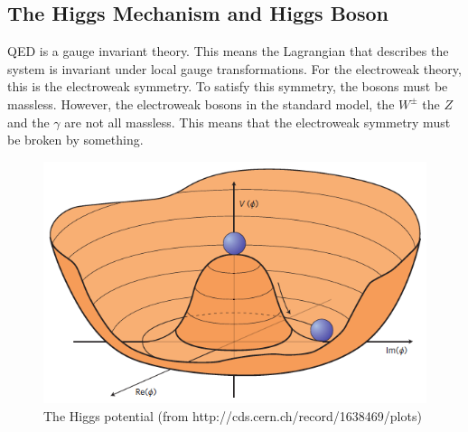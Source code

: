 


\indent %
\subsection{The Higgs Mechanism and Higgs Boson}
\label{ssec:Higgs}
QED is a gauge invariant theory. This means the Lagrangian that describes the system is invariant under local gauge transformations. For the electroweak theory, this is the electroweak symmetry. To satisfy this symmetry, the bosons must be massless. However, the electroweak bosons in the standard model, the ${W^{\pm}}$ the ${Z}$ and the ${\gamma}$ are not all massless. This means that the electroweak symmetry must be broken by something.\linebreak

\begin{figure}[h]
\begin{center}
\includegraphics[scale=0.65]{figures/higgspotential}
\caption{The Higgs potential (from http://cds.cern.ch/record/1638469/plots) }
\label{Fig:higgspot}
\end{center}
\end{figure}

